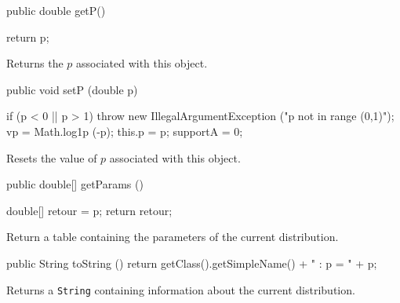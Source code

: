 \begin{code}

   public double getP()\begin{hide} {
      return p;
   }\end{hide}
\end{code}
\begin{tabb}
   Returns the $p$ associated with this object.
\end{tabb}
\begin{code}

   public void setP (double p)\begin{hide} {
      if (p < 0 || p > 1)
         throw new IllegalArgumentException ("p not in range (0,1)");
      vp = Math.log1p (-p);
      this.p = p;
      supportA = 0;
   }\end{hide}
\end{code}
\begin{tabb}
   Resets the value of $p$ associated with this object.
\end{tabb}
\begin{code}

   public double[] getParams ()\begin{hide} {
      double[] retour = {p};
      return retour;
   }\end{hide}
\end{code}
\begin{tabb}
   Return a table containing the parameters of the current distribution.
\end{tabb}
\begin{hide}\begin{code}

   public String toString () {
      return getClass().getSimpleName() + " : p = " + p;
   }
\end{code}
\begin{tabb}
   Returns a \texttt{String} containing information about the current distribution.
\end{tabb}\end{hide}
\begin{code}\begin{hide}
}\end{hide}
\end{code}
